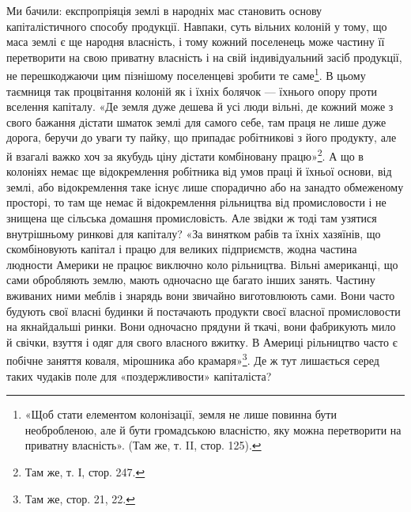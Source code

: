 Ми бачили: експропріяція землі в народніх мас становить основу капіталістичного способу продукції.
Навпаки, суть вільних колоній у тому, що маса землі є ще народня власність, і тому кожний поселенець
може частину її перетворити на свою приватну власність і на свій індивідуальний засіб продукції, не
перешкоджаючи цим пізнішому поселенцеві зробити те саме\footnote{
«Щоб стати елементом колонізації, земля не лише повинна бути необробленою, але й бути
громадською власністю, яку можна перетворити на приватну власність». (Там же, т. II, стор. 125).
}. В цьому таємниця так процвітання колоній
як і їхніх болячок — їхнього опору проти вселення капіталу. «Де земля дуже дешева й усі люди вільні,
де кожний може з свого бажання дістати шматок землі для самого себе, там праця не лише дуже дорога,
беручи до уваги ту пайку, що припадає робітникові з його продукту, але й взагалі важко хоч за
якубудь ціну дістати комбіновану працю»\footnote{
Там же, т. І, стор. 247.
}. А що в колоніях немає ще відокремлення робітника від
умов праці й їхньої основи, від землі, або відокремлення таке існує лише спорадично або на занадто
обмеженому просторі, то там ще немає й відокремлення рільництва від промисловости і не знищена ще
сільська домашня промисловість. Але звідки ж тоді там узятися внутрішньому ринкові для капіталу? «За
винятком рабів та їхніх хазяїнів, що скомбіновують капітал і працю для великих підприємств, жодна
частина людности Америки не працює виключно коло рільництва.
Вільні американці, що сами обробляють землю, мають одночасно ще багато інших занять. Частину
вживаних ними меблів і знарядь вони звичайно виготовлюють сами. Вони часто будують свої власні
будинки й постачають продукти своєї власної
промисловости на якнайдальші ринки. Вони одночасно прядуни й ткачі, вони фабрикують мило й свічки,
взуття і одяг для свого власного вжитку. В Америці рільництво часто є побічне заняття коваля,
мірошника або крамаря»\footnote{
Там же, стор. 21, 22.
}. Де ж тут лишається серед таких чудаків поле для «поздержливости»
капіталіста?

